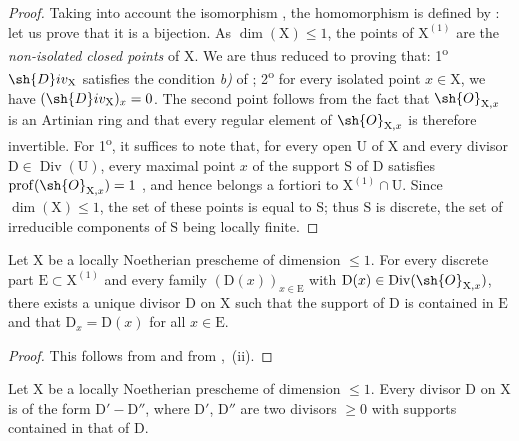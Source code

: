 \begin{proof}
Taking into account the isomorphism , the homomorphism  is defined by :
let us prove that it is a bijection.
As $\dim(\mathrm{X})\leq 1$, the points of $\mathrm{X}^{(1)}$ are the \emph{non-isolated closed points} of $\mathrm{X}$.
We are thus reduced to proving that:
1\textsuperscript{o} $\sh{D}iv_\mathrm{X}$ satisfies the condition \emph{b)} of ;
2\textsuperscript{o} for every isolated point $x\in\mathrm{X}$, we have $(\sh{D}iv_\mathrm{X})_x=0$.
The second point follows from the fact that $\sh{O}_{\mathrm{X},x}$ is an Artinian ring and that every regular element of $\sh{O}_{\mathrm{X},x}$ is therefore invertible.
For 1\textsuperscript{o}, it suffices to note that, for every open $\mathrm{U}$ of $\mathrm{X}$ and every divisor $\mathrm{D}\in\operatorname{Div}(\mathrm{U})$, every maximal point $x$ of the support $\mathrm{S}$ of $\mathrm{D}$ satisfies $\operatorname{prof}(\sh{O}_{\mathrm{X},x})=1$ , and hence belongs a fortiori to $\mathrm{X}^{(1)}\cap\mathrm{U}$.
Since $\dim(\mathrm{X})\leq1$, the set of these points is equal to $\mathrm{S}$; thus $\mathrm{S}$ is discrete, the set of irreducible components of $\mathrm{S}$ being locally finite.
\end{proof}

\begin{corollary}[21.9.5]
\label{IV.21.9.5}
Let $\mathrm{X}$ be a locally Noetherian prescheme of dimension $\leq 1$.
For every discrete part $\mathrm{E}\subset\mathrm{X}^{(1)}$ and every family $(\mathrm{D}(x))_{x\in\mathrm{E}}$ with $\mathrm{D}(x)\in\operatorname{Div}(\sh{O}_{\mathrm{X},x})$, there exists a unique divisor $\mathrm{D}$ on $\mathrm{X}$ such that the support of $\mathrm{D}$ is contained in $\mathrm{E}$ and that $\mathrm{D}_x=\mathrm{D}(x)$ for all $x\in\mathrm{E}$.
\end{corollary}

\begin{proof}
This follows from  and from ,{}~(ii).
\end{proof}

\begin{corollary}[21.9.6]
\label{IV.21.9.6}
Let $\mathrm{X}$ be a locally Noetherian prescheme of dimension $\leq 1$.
Every divisor $\mathrm{D}$ on $\mathrm{X}$ is of the form $\mathrm{D}'-\mathrm{D}''$, where $\mathrm{D}'$, $\mathrm{D}''$ are two divisors $\geq 0$ with supports contained in that of $\mathrm{D}$.
\end{corollary}


